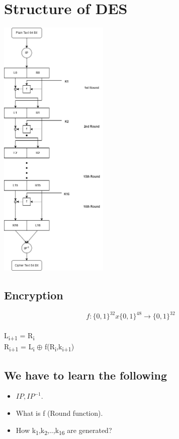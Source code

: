 \documentclass[11pt]{article}
\begin{document}
	\section{Structure of DES}
	\centering\includegraphics[width = 5.2cm]{DES.jpg}
	\flushleft\subsection{Encryption}
	$$f : \{0,1\}^{32} x \{0,1\}^{48} \rightarrow \{0,1\}^{32}$$\\
	L\textsubscript{i+1} = R\textsubscript{i}\\
	R\textsubscript{i+1} = L\textsubscript{i} $\oplus$ f(R\textsubscript{i},k\textsubscript{i+1})\\
	\subsection*{We have to learn the following}
	\begin{itemize}
		\item $IP, IP^{-1}$.
		\item What is f (Round function).
		\item How k\textsubscript{1},k\textsubscript{2},..,k\textsubscript{16} are generated?
	\end{itemize}
\end{document}
